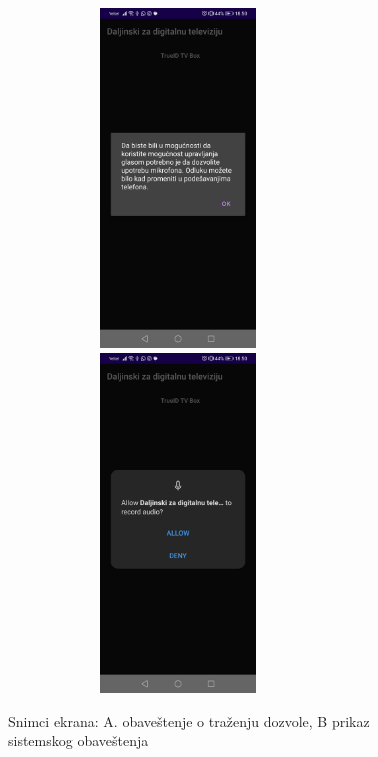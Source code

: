 \documentclass[implementacija.tex]{subfiles}
\begin{document}
\begin{figure}[h!]
\centering
\includegraphics[width=9cm,height=9cm,keepaspectratio]{Implementacija/snimci_ekrana/1_obavestenje_za_dozvolu.jpg}
\includegraphics[width=9cm,height=9cm,keepaspectratio]{Implementacija/snimci_ekrana/2_sistemska_dozvola.jpg}
\caption{Snimci ekrana: A. obaveštenje o traženju dozvole, B prikaz sistemskog obaveštenja}
\end{figure}
\end{document}
